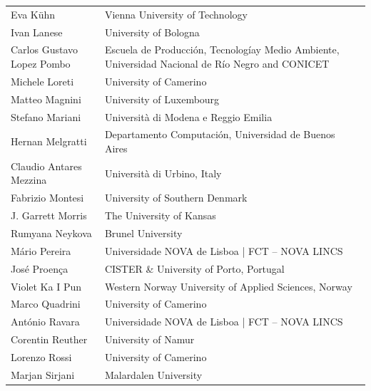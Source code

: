 \documentclass[]{llncs}
\begin{document}
\begin{longtable}{p{}p{}}
Eva K\"uhn & Vienna University of Technology\\

Ivan Lanese & University of Bologna\\

Carlos Gustavo Lopez Pombo & Escuela de Producci\'on, Tecnolog\'iay Medio Ambiente, Universidad Nacional de R\'io Negro and CONICET\\

Michele Loreti & University of Camerino\\

Matteo Magnini & University of Luxembourg\\

Stefano Mariani & Universit\`a di Modena e Reggio Emilia\\

Hernan Melgratti & Departamento Computaci\'on, Universidad de Buenos Aires\\

Claudio Antares Mezzina & Universit\`a di Urbino, Italy\\

Fabrizio Montesi & University of Southern Denmark\\

J. Garrett Morris & The University of Kansas\\

Rumyana Neykova & Brunel University\\

M\'ario Pereira & Universidade NOVA de Lisboa | FCT -- NOVA LINCS\\

Jos\'e Proen\c{c}a & CISTER \& University of Porto, Portugal\\

Violet Ka I Pun & Western Norway University of Applied Sciences, Norway\\

Marco Quadrini & University of Camerino\\

Ant\'onio Ravara & Universidade NOVA de Lisboa | FCT -- NOVA LINCS\\

Corentin Reuther & University of Namur\\

Lorenzo Rossi & University of Camerino\\

Marjan Sirjani & Malardalen University\\


\end{longtable}
\end{document}
